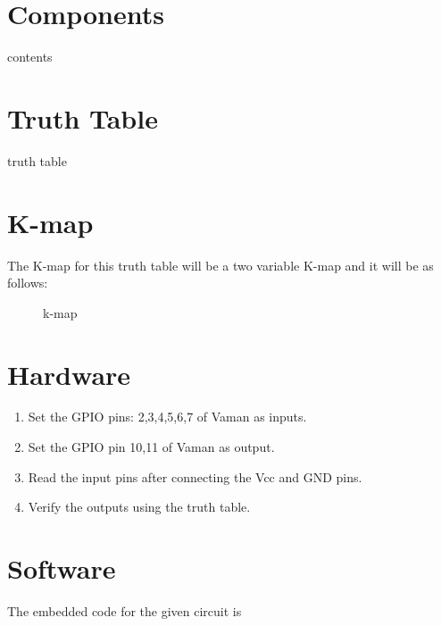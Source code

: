 \documentclass[journal,twocolumn,10pt, a4paper]{article}
\begin{document}
\section{Components}
\begin{table}[h]

\caption{contents}
\label{table 1}
\end{table}


\section{Truth Table}
\begin{table}[h]
\begin{center}

\end{center}
\caption{truth table}
\label{table 2}
\end{table}
\pagebreak

\section{K-map}
The K-map for this truth table will be a two variable K-map and it will be as follows:
\begin{figure}[h]

\caption{k-map}
\label{fig2}
\end{figure}

\section{Hardware}                                      
\begin{enumerate}                                        
\item Set the GPIO pins: 2,3,4,5,6,7 of Vaman as inputs.
\item Set the GPIO pin 10,11 of Vaman as output.         
\item Read the input pins after connecting the Vcc and GND pins.                                                  
\item Verify the outputs using the truth table.         
\end{enumerate}

\section{Software}
The embedded code for the given circuit is \\

\end{document}
